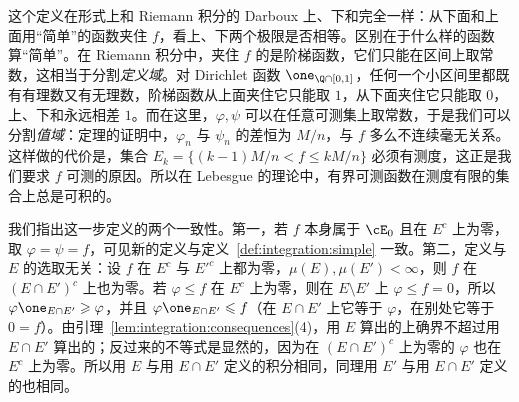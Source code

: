 \begin{remark}
这个定义在形式上和 Riemann 积分的 Darboux 上、下和完全一样：从下面和上面用“简单”的函数夹住 $f$，看上、下两个极限是否相等。区别在于什么样的函数算“简单”。在 Riemann 积分中，夹住 $f$ 的是阶梯函数，它们只能在区间上取常数，这相当于分割\emph{定义域}。对 Dirichlet 函数 $\one_{\Q\cap[0,1]}$，任何一个小区间里都既有有理数又有无理数，阶梯函数从上面夹住它只能取 $1$，从下面夹住它只能取 $0$，上、下和永远相差 $1$。而在这里，$\varphi,\psi$ 可以在任意可测集上取常数，于是我们可以分割\emph{值域}：定理的证明中，$\varphi_n$ 与 $\psi_n$ 的差恒为 $M/n$，与 $f$ 多么不连续毫无关系。这样做的代价是，集合 $E_k=\{(k-1)M/n<f\leqslant kM/n\}$ 必须有测度，这正是我们要求 $f$ 可测的原因。所以在 Lebesgue 的理论中，有界可测函数在测度有限的集合上总是可积的。
\end{remark}

我们指出这一步定义的两个一致性。第一，若 $f$ 本身属于 $\cE_0$ 且在 $E^c$ 上为零，取 $\varphi=\psi=f$，可见新的定义与定义~\ref{def:integration:simple} 一致。第二，定义与 $E$ 的选取无关：设 $f$ 在 $E^c$ 与 $E'^c$ 上都为零，$\mu(E),\mu(E')<\infty$，则 $f$ 在 $(E\cap E')^c$ 上也为零。若 $\varphi\leqslant f$ 在 $E^c$ 上为零，则在 $E\setminus E'$ 上 $\varphi\leqslant f=0$，所以 $\varphi\one_{E\cap E'}\geqslant\varphi$，并且 $\varphi\one_{E\cap E'}\leqslant f$（在 $E\cap E'$ 上它等于 $\varphi$，在别处它等于 $0=f$）。由引理~\ref{lem:integration:consequences}(4)，用 $E$ 算出的上确界不超过用 $E\cap E'$ 算出的；反过来的不等式是显然的，因为在 $(E\cap E')^c$ 上为零的 $\varphi$ 也在 $E^c$ 上为零。所以用 $E$ 与用 $E\cap E'$ 定义的积分相同，同理用 $E'$ 与用 $E\cap E'$ 定义的也相同。

